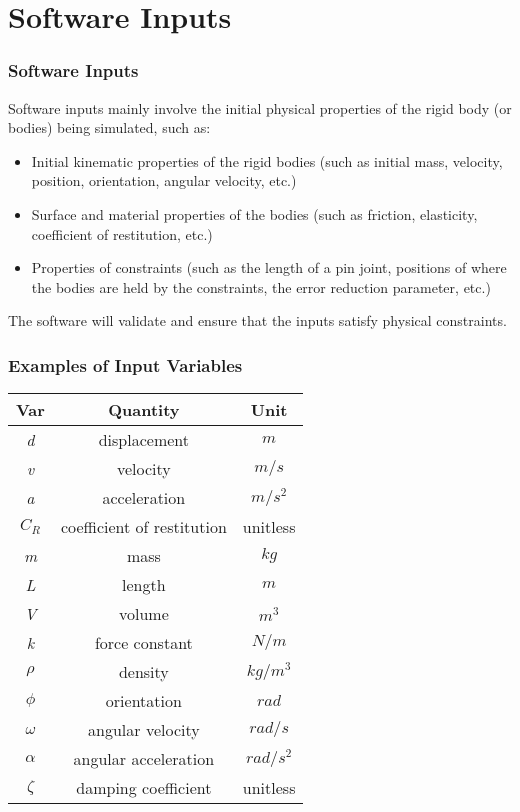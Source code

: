 \documentclass{beamer}
\begin{document}
\section[Inputs]{Software Inputs}


\begin{frame}

\frametitle{Software Inputs}

Software inputs mainly involve the initial physical properties of the rigid body (or bodies) being simulated, such as:

\begin{itemize}
	\item Initial kinematic properties of the rigid bodies (such as initial mass, velocity, position, orientation, angular velocity, etc.)
	\item Surface and material properties of the bodies (such as friction, elasticity, coefficient of restitution, etc.)
	\item Properties of constraints (such as the length of a pin joint, positions of where the bodies are held by the constraints, the error reduction parameter, etc.)
\end{itemize}

The software will validate and ensure that the inputs satisfy physical constraints.

\end{frame}


\begin{frame}
	
	\frametitle{Examples of Input Variables}
	
	\begin{center}
	\begin{tabular}{||c | c | c||}
		\hline 
		Var & Quantity & Unit \\
		\hline\hline 
		\textit{d} & displacement & $m$ \\
		\textit{v} & velocity & $m/s$ \\
		\textit{a} & acceleration & $m/s^2$ \\
		\textit{$C_R$} & coefficient of restitution & unitless \\
		\textit{m} & mass & $kg$ \\
		\textit{L} & length & $m$ \\
		\textit{V} & volume & $m^3$ \\
		\textit{k} & force constant & $N/m$ \\
		\textit{$\rho$} & density & $kg/m^3$ \\
		\textit{$\phi$} & orientation & $rad$ \\
		\textit{$\omega$} & angular velocity & $rad/s$ \\
		\textit{$\alpha$} & angular acceleration & $rad/s^2$ \\
		\textit{$\zeta$} & damping coefficient & unitless \\
		\hline 
	\end{tabular}
	\end{center}
	
\end{frame}
\end{document}

